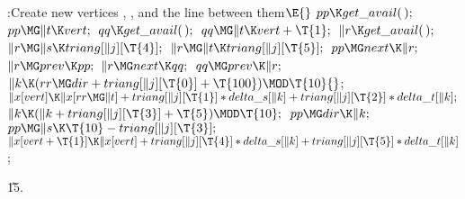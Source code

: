 \B{}:Create new vertices , , and the line  between them\X${}\E{}$\6
$\\{pp}\K\\{get\_avail}(\,);{}$\6
${}\\{pp}\MG\|t\K\\{vert};{}$\6
${}\\{qq}\K\\{get\_avail}(\,);{}$\6
${}\\{qq}\MG\|t\K\\{vert}+\T{1};{}$\6
${}\|r\K\\{get\_avail}(\,);{}$\6
${}\|r\MG\|s\K\\{triang}[\|j][\T{4}];{}$\6
${}\|r\MG\|t\K\\{triang}[\|j][\T{5}];{}$\6
${}\\{pp}\MG\\{next}\K\|r;{}$\6
${}\|r\MG\\{prev}\K\\{pp};{}$\6
${}\|r\MG\\{next}\K\\{qq};{}$\6
${}\\{qq}\MG\\{prev}\K\|r;{}$\6
${}\|k\K(\\{rr}\MG\\{dir}+\\{triang}[\|j][\T{0}]+\T{100})\MOD\T{10}{}$;\6
${}\|x[\\{vert}]\K\|x[\\{rr}\MG\|t]+\\{triang}[\|j][\T{1}]*\\{delta\_s}[\|k]+%
\\{triang}[\|j][\T{2}]*\\{delta\_t}[\|k];{}$\6
${}\|k\K(\|k+\\{triang}[\|j][\T{3}]+\T{5})\MOD\T{10};{}$\6
${}\\{pp}\MG\\{dir}\K\|k;{}$\6
${}\\{pp}\MG\|s\K\T{10}-\\{triang}[\|j][\T{3}];{}$\6
${}\|x[\\{vert}+\T{1}]\K\|x[\\{vert}]+\\{triang}[\|j][\T{4}]*\\{delta\_s}[\|k]+%
\\{triang}[\|j][\T{5}]*\\{delta\_t}[\|k]{}$;\par
\U15.\fi

